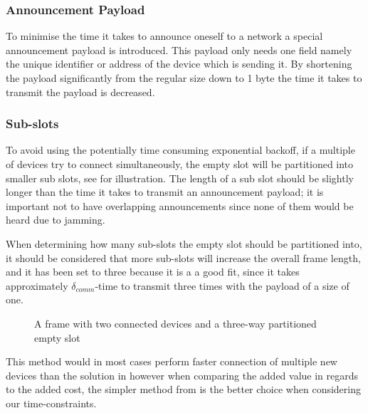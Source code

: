 \subsubsection*{Announcement Payload}\label{apay} %
\label{ssub:announcements}
To minimise the time it takes to announce oneself to a network a special announcement payload is introduced.
This payload only needs one field namely the unique identifier or address of the device which is sending it.
By shortening the payload significantly from the regular size down to 1 byte the time it takes to transmit the payload is decreased.

\subsubsection{Sub-slots} %
\label{ssub:sub_slots}
To avoid using the potentially time consuming exponential backoff, if a multiple of devices try to connect simultaneously, the empty slot will be partitioned into smaller sub slots, see  for illustration. 
The length of a sub slot should be slightly longer than the time it takes to transmit an announcement payload; it is important not to have overlapping announcements since none of them would be heard due to jamming.

When determining how many sub-slots the empty slot should be partitioned into, it should be considered that more sub-slots will increase the overall frame length, and it has been set to three because it is a a good fit, since it takes approximately $\delta_{comm}$-time to transmit three times with the payload of a size of one.

\begin{figure}[h]
    \centering \footnotesize
    
    \caption{A frame with two connected devices and a three-way partitioned empty slot}
    \label{fig:frame_wsubslots}
\end{figure}

\noindent
This method would in most cases perform faster connection of multiple new devices than the solution in  however when comparing the added value in regards to the added cost, the simpler method from  is the better choice when considering our time-constraints.